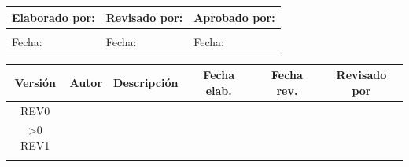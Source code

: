 \begin{titlepage}
	\thispagestyle{corporativo}

	\vspace*{1.5cm}

	\centering
	{\Large\bfseries \projecttitle}

	\vspace{4cm}



	\centering
	\fontsize{10}{12}\selectfont
	\renewcommand{\arraystretch}{1.3}
	\setlength{\tabcolsep}{3pt}

	\begin{tabular}{|p{}|p{}|p{}|}
		\hline
		\rowcolor{green!15}
		\textbf{Elaborado por:} & \textbf{Revisado por:} & \textbf{Aprobado por:} \\
		\hline
		\centering\arraybackslash\rule{0pt}{1.5cm} \firmaElaboro & \centering\arraybackslash\rule{0pt}{1.5cm} \firmaReviso & \centering\arraybackslash\rule{0pt}{1.5cm} \firmaAprobo \\
		\hline
		\centering\arraybackslash Fecha: \fechaElaboro & \centering\arraybackslash Fecha: \fechaReviso & \centering\arraybackslash Fecha: \fechaAprobo \\
		\hline
	\end{tabular}

	\vspace{2.5cm}

	\centering
	\fontsize{10}{12}\selectfont
	\renewcommand{\arraystretch}{1.2}
	\setlength{\tabcolsep}{3pt}

	\begin{tabular}{|c|c|p{}|c|c|c|}
		\hline
		\rowcolor{green!15}
		\textbf{Versión} & \textbf{Autor} & \textbf{Descripción} & \textbf{Fecha elab.} & \textbf{Fecha rev.} & \textbf{Revisado por} \\
		\hline
		REV0 & \firmaElaboro & \descRevCero & \fechaRevCero & \fechaRevCero & \firmaReviso \\
		\hline
		\ifnum\docRevision>0
		REV1 & \firmaElaboro & \descRevUno & \fechaRevUno & \fechaRevUno & \firmaReviso \\
		\hline
		\fi
	\end{tabular}

	\vfill

\end{titlepage}
